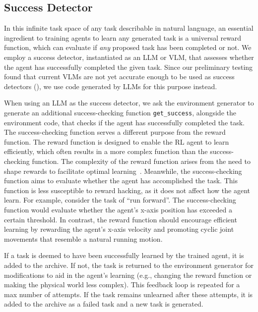 \documentclass{article} %
\begin{document}
\vspace{-4pt}
\subsection{Success Detector}
\label{subsec:success-detector}
\vspace{-4pt}

In this infinite task space of any task describable in natural language, an essential ingredient to training agents to learn any generated task is a universal reward function, which can evaluate if \emph{any} proposed task has been completed or not. We employ a success detector, instantiated as an LLM or VLM, that assesses whether the agent has successfully completed the given task. Since our preliminary testing found that current VLMs are not yet accurate enough to be used as success detectors (), we use code generated by LLMs for this purpose instead.

When using an LLM as the success detector, we ask the environment generator to generate an additional success-checking function \texttt{get\_success}, alongside the environment code, that checks if the agent has successfully completed the task. The success-checking function serves a different purpose from the reward function. The reward function is designed to enable the RL agent to learn efficiently, which often results in a more complex function than the success-checking function. The complexity of the reward function arises from the need to shape rewards to facilitate optimal learning~\citep{krakovna2020specification}. Meanwhile, the success-checking function aims to evaluate whether the agent has accomplished the task. This function is less susceptible to reward hacking, as it does not affect how the agent learn.
For example, consider the task of ``run forward''. The success-checking function would evaluate whether the agent's x-axis position has exceeded a certain threshold. In contrast, the reward function should encourage efficient learning by rewarding the agent's x-axis velocity and promoting cyclic joint movements that resemble a natural running motion.

If a task is deemed to have been successfully learned by the trained agent, it is added to the archive. If not, the task is returned to the environment generator for modifications to aid in the agent's learning (e.g., changing the reward function or making the physical world less complex). This feedback loop is repeated for a max number of attempts. If the task remains unlearned after these attempts, it is added to the archive as a failed task and a new task is generated.
\end{document}
